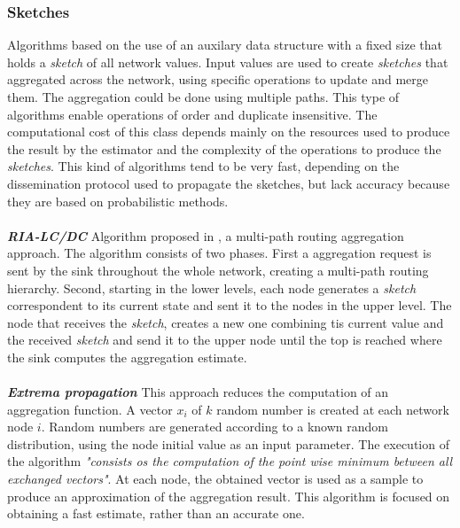 \subsubsection{Sketches}
Algorithms based on the use of an auxilary data structure with a fixed size that holds a \textit{sketch} of all network values. Input values are used to create \textit{sketches} that aggregated across the network, using specific operations to update and merge them. The aggregation could be done using multiple paths. This type of algorithms enable operations of order and duplicate insensitive. The computational cost of this class depends mainly on the resources used to produce the result by the estimator and the complexity of the operations to produce the \textit{sketches}. This kind of algorithms tend to be very fast, depending on the dissemination protocol used to propagate the sketches, but lack accuracy because they are based on probabilistic methods.\\
\\
\textbf{\textit{RIA-LC/DC}} Algorithm proposed in \cite{fan2008efficient}, a multi-path routing aggregation approach. The algorithm consists of two phases. First a aggregation request is sent by the sink throughout the whole network, creating a multi-path routing hierarchy. Second, starting in the lower levels, each node generates a \textit{sketch} correspondent to its current state and sent it to the nodes in the upper level. The node that receives the \textit{sketch}, creates a new one combining tis current value and the received \textit{sketch} and send it to the upper node until the top is reached where the sink computes the aggregation estimate.\\
\\
\textbf{\textit{Extrema propagation}}
This approach reduces the computation of an aggregation function\cite{journals/corr/abs-1110-0725}. A vector $x_i$ of $k$ random number is created at each network node $i$. Random numbers are generated according to a known random distribution, using the node initial value as an input parameter. The execution of the algorithm \textit{"consists os the computation of the point wise minimum between all exchanged vectors"}\cite{journals/corr/abs-1110-0725}. At each node, the obtained vector is used as a sample to produce an approximation of the aggregation result. This algorithm is focused on obtaining a fast estimate, rather than an accurate one. 
